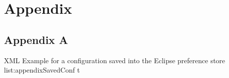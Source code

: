 \chapter*{Appendix}
\section*{Appendix A}
\label{section:AppendixSavedConf}
\listingxml
{}
{XML}
{Example for a configuration saved into the Eclipse preference store}
{list:appendixSavedConf}
{t}
